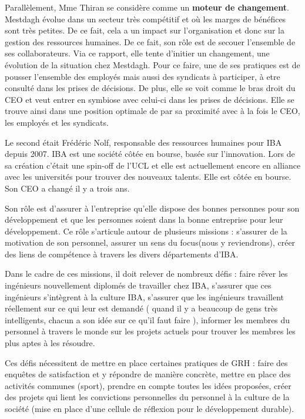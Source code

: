 \documentclass[a4paper, 12pt]{article}
\begin{document}
Parallèlement, Mme Thiran se considère comme un \textbf{moteur de changement}. Mestdagh évolue dans un secteur très compétitif et où les marges de bénéfices sont très petites. De ce fait, cela a un impact sur l'organisation et donc sur la gestion des ressources humaines. De ce fait, son rôle est de secouer l'ensemble de ses collaborateurs. Via ce rapport, elle tente d'initier un changement, une évolution de la situation chez Mestdagh. \newline
Pour ce faire, une de ses pratiques est de pousser l'ensemble des employés mais aussi des syndicats à participer, à etre consulté dans les prises de décisions. De plus, elle se voit comme le bras droit du CEO et veut entrer en symbiose avec celui-ci dans les prises de décisions. Elle se trouve ainsi dans une position optimale de par sa proximité avec à la fois le CEO, les employés et les syndicats.\newline

Le second était Frédéric Nolf, responsable des ressources humaines pour IBA depuis 2007. IBA est une société côtée en bourse, basée sur l'innovation. Lors de sa création c'était une spin-off de l'UCL et elle est actuellement encore en alliance avec les universités pour trouver des nouveaux talents. Elle est côtée en bourse. Son CEO a changé il y a trois ans.

Son rôle est d'assurer à l'entreprise qu'elle dispose des bonnes personnes pour son développement et que les personnes soient dans la bonne entreprise pour leur développement. Ce rôle s'articule autour de plusieurs missions : s'assurer de la motivation de son personnel, assurer un \og{} sens du focus\fg{}(nous y reviendrons), créer des liens de compétence à travers les divers départements d'IBA. \newline


Dans le cadre de ces missions, il doit relever de nombreux défis : faire rêver les ingénieurs nouvellement diplomés de travailler chez IBA, s'assurer que ces ingénieurs s'intègrent à la culture IBA, s'assurer que les ingénieurs travaillent réellement sur ce qui leur est demandé (\og{} quand il y a beaucoup de gens très intelligents, chacun a son idée sur ce qu'il faut faire \fg{}), informer les membres du personnel à travers le monde sur les projets actuels pour trouver les membres les plus aptes à les résoudre. \newline

Ces défis nécessitent de mettre en place certaines pratiques de GRH : faire des enquêtes de satisfaction et y répondre de manière concrète, mettre en place des activités communes (sport), prendre en compte toutes les idées proposées, créer des projets qui lient les convictions personnelles du personnel à la culture de la société (mise en place d'une cellule de réflexion pour le développement durable). \newline
\end{document}
